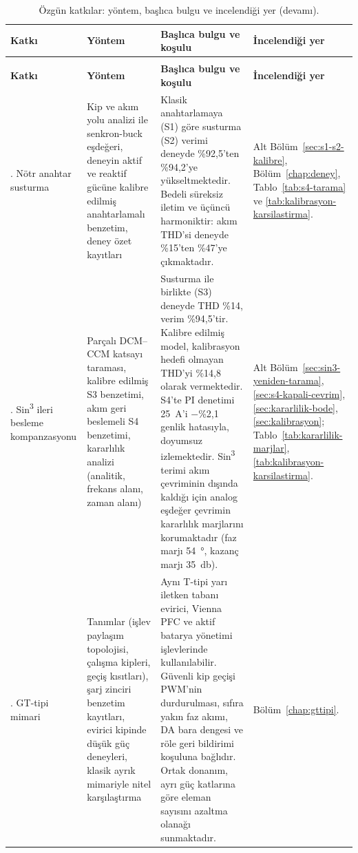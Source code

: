 \begingroup
\setlength{\tabcolsep}{3pt}
\begin{longtable}{@{}>{\footnotesize\raggedright\arraybackslash}p{}%
                     >{\footnotesize\raggedright\arraybackslash}p{}%
                     >{\footnotesize\raggedright\arraybackslash}p{}%
                     >{\footnotesize\raggedright\arraybackslash}p{}@{}}
  \caption{Özgün katkılar: yöntem, başlıca bulgu ve incelendiği yer.}
  \label{tab:katki-yontem-kanit}\\
  \toprule
  \textbf{Katkı} & \textbf{Yöntem} & \textbf{Başlıca bulgu ve koşulu} & \textbf{İncelendiği yer} \\
  \midrule
  \endfirsthead
  \caption[]{Özgün katkılar: yöntem, başlıca bulgu ve incelendiği yer (devamı).}\\
  \toprule
  \textbf{Katkı} & \textbf{Yöntem} & \textbf{Başlıca bulgu ve koşulu} & \textbf{İncelendiği yer} \\
  \midrule
  \endhead
  \bottomrule
  \endfoot
    1. Nötr anahtar susturma &
    Kip ve akım yolu analizi ile senkron-buck eşdeğeri, deneyin aktif ve reaktif gücüne kalibre edilmiş anahtarlamalı benzetim, deney özet kayıtları &
    Klasik anahtarlamaya (S1) göre susturma (S2) verimi deneyde \%92,5'ten \%94,2'ye yükseltmektedir. Bedeli süreksiz iletim ve üçüncü harmoniktir: akım THD'si deneyde \%15'ten \%47'ye çıkmaktadır. &
    Alt Bölüm~\ref{sec:s1-s2-kalibre}, Bölüm~\ref{chap:deney}, Tablo~\ref{tab:s4-tarama} ve \ref{tab:kalibrasyon-karsilastirma}. \\
    \addlinespace
    2. Sin\textsuperscript{3} ileri besleme kompanzasyonu &
    Parçalı DCM--CCM katsayı taraması, kalibre edilmiş S3 benzetimi, akım geri beslemeli S4 benzetimi, kararlılık analizi (analitik, frekans alanı, zaman alanı) &
    Susturma ile birlikte (S3) deneyde THD \%14, verim \%94,5'tir. Kalibre edilmiş model, kalibrasyon hedefi olmayan THD'yi \%14,8 olarak vermektedir. S4'te PI denetimi \SI{25}{\ampere}'i $-$\%2,1 genlik hatasıyla, doyumsuz izlemektedir. Sin\textsuperscript{3} terimi akım çevriminin dışında kaldığı için analog eşdeğer çevrimin kararlılık marjlarını korumaktadır (faz marjı \SI{54}{\degree}, kazanç marjı \SI{35}{\decibel}). &
    Alt Bölüm~\ref{sec:sin3-yeniden-tarama}, \ref{sec:s4-kapali-cevrim}, \ref{sec:kararlilik-bode}, \ref{sec:kalibrasyon}; Tablo~\ref{tab:kararlilik-marjlar}, \ref{tab:kalibrasyon-karsilastirma}. \\
    \addlinespace
    3. GT-tipi mimari &
    Tanımlar (işlev paylaşım topolojisi, çalışma kipleri, geçiş kısıtları), şarj zinciri benzetim kayıtları, evirici kipinde düşük güç deneyleri, klasik ayrık mimariyle nitel karşılaştırma &
    Aynı T-tipi yarı iletken tabanı evirici, Vienna PFC ve aktif batarya yönetimi işlevlerinde kullanılabilir. Güvenli kip geçişi PWM'nin durdurulması, sıfıra yakın faz akımı, DA bara dengesi ve röle geri bildirimi koşuluna bağlıdır. Ortak donanım, ayrı güç katlarına göre eleman sayısını azaltma olanağı sunmaktadır. &
    Bölüm~\ref{chap:gttipi}. \\
\end{longtable}
\endgroup

